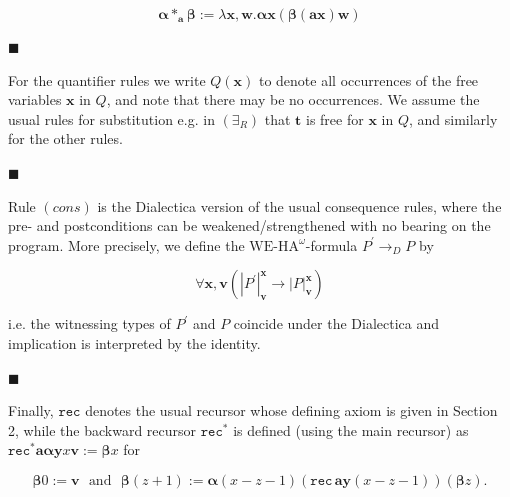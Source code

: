 \par  \quad  \[\bm{\alpha}\ast_{\bm{a}}\bm{\beta}:=\lambda\bm{x},\bm{w}.\bm{\alpha}\bm{x}\left(\bm{\beta}(\bm{a}\bm{x})\bm{w}\right)\]\quad  \quad  
  
 
 
\par\noindent  $\blacksquare$ 
 
For the quantifier rules we write $Q(\bm{x})$ to denote all occurrences of the free variables $\bm{x}$ in $Q$, and note that there may be no occurrences. We assume the usual rules for substitution e.g. in $(\exists_{R})$ that $\bm{t}$ is free for $\bm{x}$ in $Q$, and similarly for the other rules.\par
 
 
 
\par\noindent  $\blacksquare$ 
 
Rule $(cons)$ is the Dialectica version of the usual consequence rules, where the pre- and postconditions can be weakened/strengthened with no bearing on the program. More precisely, we define the $\mathrm{WE}\mbox{-}\mathrm{HA}^{\omega}$-formula $P^{\prime}\to_{D}P$ by\par
  
\par  \quad  \[\forall\bm{x},\bm{v}\left(|{P^{\prime}}|^{\bm{x}}_{\bm{v}}\to|{P}|^{\bm{x}}_{\bm{v}}\right)\]\quad  \quad  
  
i.e. the witnessing types of $P^{\prime}$ and $P$ coincide under the Dialectica and implication is interpreted by the identity.\par
 
 
 
\par\noindent  $\blacksquare$ 
 
Finally, $\mathtt{rec}$ denotes the usual recursor whose defining axiom is given in Section 2, while the backward recursor $\mathtt{rec}^{\ast}$ is defined (using the main recursor) as $\mathtt{rec}^{\ast}\bm{a}\bm{\alpha}\bm{y}x\bm{v}:=\bm{\beta}x$ for\par
  
\par  \quad  \[\bm{\beta}0:=\bm{v}\ \ \ \mbox{and}\ \ \ \bm{\beta}(z+1):=\bm{\alpha}(x-z-1)(\mathtt{rec}\,\bm{a}\bm{y}(x-z-1))(\bm{\beta}z).\]\quad  \quad  
  
 
